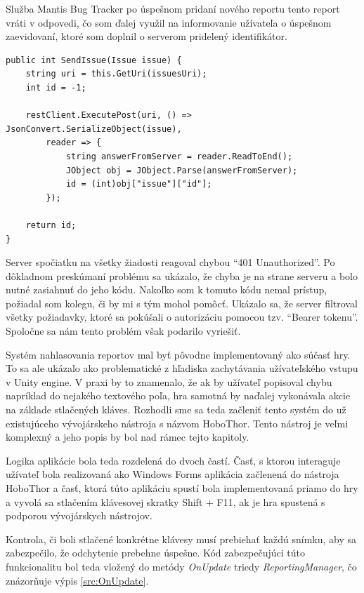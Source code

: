 \documentclass[slovak, bachelorpractice]{diploma}
\begin{document}
Služba Mantis Bug Tracker po úspešnom pridaní nového reportu tento report vráti v odpovedi, čo som ďalej využil na informovanie užívateľa o úspešnom zaevidovaní, ktoré som doplnil o serverom pridelený identifikátor.
\vspace{10pt}
\begin{lstlisting}[label=src:SendIssue,caption={Odoslanie nového reportu na server}]
public int SendIssue(Issue issue) {
	string uri = this.GetUri(issuesUri);
	int id = -1;

	restClient.ExecutePost(uri, () => JsonConvert.SerializeObject(issue),
        reader => {
            string answerFromServer = reader.ReadToEnd();
            JObject obj = JObject.Parse(answerFromServer);
            id = (int)obj["issue"]["id"];
        });

    return id;
}
\end{lstlisting}
Server spočiatku na všetky žiadosti reagoval chybou \enquote{401 Unauthorized}. Po dôkladnom preskúmaní problému sa ukázalo, že chyba je na strane serveru a bolo nutné zasiahnuť do jeho kódu. Nakoľko som k tomuto kódu nemal prístup, požiadal som kolegu, či by mi s tým mohol pomôcť. Ukázalo sa, že server filtroval všetky požiadavky, ktoré sa pokúšali o autorizáciu pomocou tzv. \enquote{Bearer tokenu}. Spoločne sa nám tento problém však podarilo vyriešiť. 

Systém nahlasovania reportov mal byť pôvodne implementovaný ako súčasť hry. To sa ale ukázalo ako problematické z hľadiska zachytávania užívateľského vstupu v Unity engine. V praxi by to znamenalo, že ak by užívateľ popisoval chybu napríklad do nejakého textového poľa, hra samotná by naďalej vykonávala akcie na základe stlačených kláves. Rozhodli sme sa teda začleniť tento systém do už existujúceho vývojárskeho nástroja s názvom HoboThor. Tento nástroj je veľmi komplexný a jeho popis by bol nad rámec tejto kapitoly.

Logika aplikácie bola teda rozdelená do dvoch častí. Časť, s ktorou interaguje užívateľ bola realizovaná ako Windows Forms aplikácia začlenená do nástroja HoboThor a časť, ktorá túto aplikáciu spustí bola implementovaná priamo do hry a vyvolá sa stlačením klávesovej skratky Shift + F11, ak je hra spustená s podporou vývojárskych nástrojov. 

Kontrola, či boli stlačené konkrétne klávesy musí prebiehať každú snímku, aby sa zabezpečilo, že odchytenie prebehne úspešne. Kód zabezpečujúci túto funkcionalitu bol teda vložený do metódy \textit{OnUpdate} triedy \textit{ReportingManager}, čo znázorňuje výpis \ref{src:OnUpdate}. 
\end{document}
